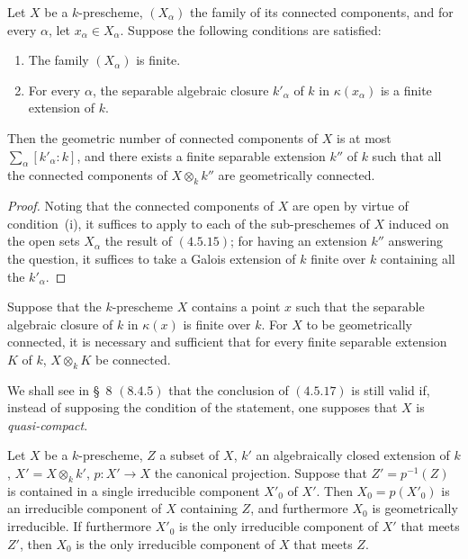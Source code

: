 \begin{corollary}[4.5.16]
\label{IV.4.5.16}
Let $X$ be a $k$-prescheme, $(X_\alpha)$ the family of its connected components, and for every $\alpha$, let $x_\alpha\in X_\alpha$.
Suppose the following conditions are satisfied:
\begin{enumerate}[label=(\roman*)]
  \item The family $(X_\alpha)$ is finite.
  \item For every $\alpha$, the separable algebraic closure $k'_\alpha$ of $k$ in $\kappa(x_\alpha)$ is a finite extension of $k$.
\end{enumerate}
Then the geometric number of connected components of $X$ is at most $\sum_\alpha [k'_\alpha:k]$, and there exists a finite separable extension $k''$ of $k$ such that all the connected components of $X\otimes_k k''$ are geometrically connected.
\end{corollary}

\begin{proof}
Noting that the connected components of $X$ are open by virtue of condition~(i), it suffices to apply to each of the sub-preschemes of $X$ induced on the open sets $X_\alpha$ the result of $(4.5.15)$; for having an extension $k''$ answering the question, it suffices to take a Galois extension of $k$ finite over $k$ containing all the $k'_\alpha$.
\end{proof}

\begin{corollary}[4.5.17]
\label{IV.4.5.17}
Suppose that the $k$-prescheme $X$ contains a point $x$ such that the separable algebraic closure of $k$ in $\kappa(x)$ is finite over $k$.
For $X$ to be geometrically connected, it is necessary and sufficient that for every finite separable extension $K$ of $k$, $X\otimes_k K$ be connected.
\end{corollary}


\begin{remark}[4.5.18]
\label{IV.4.5.18}
We shall see in \S~8 $(8.4.5)$ that the conclusion of $(4.5.17)$ is still valid if, instead of supposing the condition of the statement, one supposes that $X$ is \emph{quasi-compact}.
\end{remark}

\begin{proposition}[4.5.19]
\label{IV.4.5.19}
Let $X$ be a $k$-prescheme, $Z$ a subset of $X$, $k'$ an algebraically closed extension of $k$, $X'=X\otimes_k k'$, $p:X'\to X$ the canonical projection.
Suppose that $Z'=p^{-1}(Z)$ is contained in a single irreducible component $X'_0$ of $X'$.
Then $X_0=p(X'_0)$ is an irreducible component of $X$ containing $Z$, and furthermore $X_0$ is geometrically irreducible.
If furthermore $X'_0$ is the only irreducible component of $X'$ that meets $Z'$, then $X_0$ is the only irreducible component of $X$ that meets $Z$.
\end{proposition}

